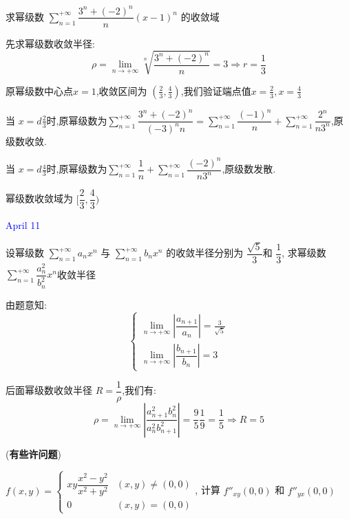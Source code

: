 \begin{example}[][Exam: 30.2.6]
	求幂级数 $\sum\limits_{n=1}^{+\infty}\dfrac{3^n+(-2)^n}{n}(x-1)^n$ 的收敛域
\end{example}

\begin{solution}
	
	先求幂级数收敛半径: 
	$$\rho=\lim\limits_{n\to +\infty}\sqrt[n]{\frac{3^n+(-2)^n}{n}}=3\Rightarrow r=\frac{1}{3}$$
	
	原幂级数中心点$x=1$,收敛区间为 $(\frac{2}{3},\frac{4}{3})$,我们验证端点值$x=\frac{2}{3},x=\frac{4}{3}$
	
	当 $x=d\frac{2}{3}$时,原幂级数为$\sum\limits_{n=1}^{+\infty}\dfrac{3^n+(-2)^{n}}{(-3)^{n}n}=\sum\limits_{n=1}^{+\infty}\dfrac{(-1)^n}{n}+\sum\limits_{n=1}^{+\infty}\dfrac{2^n}{n3^n}$,原级数收敛.
	
	当 $x=d\frac{4}{3}$时,原幂级数为$\sum\limits_{n=1}^{+\infty}\dfrac{1}{n}+\sum\limits_{n=1}^{+\infty}\dfrac{(-2)^n}{n3^n}$,原级数发散.
	
	幂级数收敛域为 $[\dfrac{2}{3},\dfrac{4}{3})$
\end{solution}

\textcolor{blue}{April 11}

\begin{example}[][Exam: 30.2.7]
	设幂级数 $\sum\limits_{n=1}^{+\infty}a_{n}x^{n}$ 与 $\sum\limits_{n=1}^{+\infty}b_{n}x^{n}$ 的收敛半径分别为 $\dfrac{\sqrt{5}}{3}$和 $\dfrac{1}{3}$,
	求幂级数 $\sum\limits_{n=1}^{+\infty}\dfrac{a_{n}^{2}}{b_{n}^{2}}x^{n}$收敛半径
\end{example}

\begin{solution}
	由题意知: 
	$$\left\lbrace 
	\begin{array}{l}
		\lim\limits_{n\to+\infty}|\dfrac{a_{n+1}}{a_{n}}|=\frac{3}{\sqrt{5}}\\
		\lim\limits_{n\to+\infty}|\dfrac{b_{n+1}}{b_{n}}|=3
	\end{array}
	\right. $$
	
	后面幂级数收敛半径 $R=\dfrac{1}{\rho}$,我们有: 
	$$\rho=\lim\limits_{n\to+\infty}|\frac{a^{2}_{n+1}b_{n}^{2}}{a^{2}_{n}b_{n+1}^{2}}|=\frac{9}{5}\frac{1}{9}=\frac{1}{5}\Rightarrow R=5$$
	
	(\textbf{有些许问题})
\end{solution}

\begin{example}[][Exam: 30.2.8]
	$f(x,y) = 
	\begin{cases}
		xy\dfrac{x^2-y^2}{x^2+y^2} & (x,y)\neq (0,0)\\
		0 & (x,y)=(0,0)  
	\end{cases}$, 计算 $f''_{xy}(0,0)$ 和 $f''_{yx}(0,0)$
\end{example}

